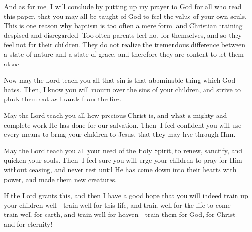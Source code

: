 \documentclass[
]{book}
\begin{document}
And as for me, I will conclude by putting up my prayer to God for all who read this paper, that you may all be taught of God to feel the value of your own souls. This is one reason why baptism is too often a mere form, and Christian training despised and disregarded. Too often parents feel not for themselves, and so they feel not for their children. They do not realize the tremendous difference between a state of nature and a state of grace, and therefore they are content to let them alone.

Now may the Lord teach you all that sin is that abominable thing which God hates. Then, I know you will mourn over the sins of your children, and strive to pluck them out as brands from the fire.

May the Lord teach you all how precious Christ is, and what a mighty and complete work He has done for our salvation. Then, I feel confident you will use every means to bring your children to Jesus, that they may live through Him.

May the Lord teach you all your need of the Holy Spirit, to renew, sanctify, and quicken your souls. Then, I feel sure you will urge your children to pray for Him without ceasing, and never rest until He has come down into their hearts with power, and made them new creatures.

If the Lord grants this, and then I have a good hope that you will indeed train up your children well---train well for this life, and train well for the life to come---train well for earth, and train well for heaven---train them for God, for Christ, and for eternity!
\end{document}
